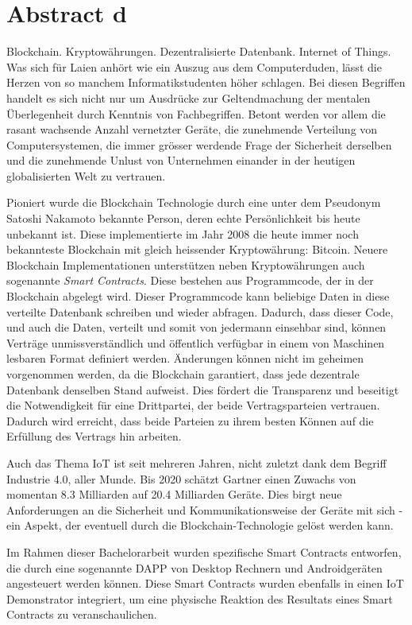 \chapter{Abstract d}
\label{cha:abstract_d}
Blockchain. Kryptowährungen. Dezentralisierte Datenbank. Internet of Things. Was sich für Laien anhört wie ein Auszug aus dem Computerduden, lässt die Herzen von so manchem Informatikstudenten höher schlagen. Bei diesen Begriffen handelt es sich nicht nur um Ausdrücke zur Geltendmachung der mentalen Überlegenheit durch Kenntnis von Fachbegriffen. Betont werden vor allem die rasant wachsende Anzahl vernetzter Geräte, die zunehmende Verteilung von Computersystemen, die immer grösser werdende Frage der Sicherheit derselben und die zunehmende Unlust von Unternehmen einander in der heutigen globalisierten Welt zu vertrauen.

Pioniert wurde die Blockchain Technologie durch eine unter dem Pseudonym Satoshi Nakamoto bekannte Person, deren echte Persönlichkeit bis heute unbekannt ist. Diese implementierte im Jahr 2008 die heute immer noch bekannteste Blockchain mit gleich heissender Kryptowährung: Bitcoin. Neuere Blockchain Implementationen unterstützen neben Kryptowährungen auch sogenannte \emph{Smart Contracts}. Diese bestehen aus Programmcode, der in der Blockchain abgelegt wird. Dieser Programmcode kann beliebige Daten in diese verteilte Datenbank schreiben und wieder abfragen. Dadurch, dass dieser Code, und auch die Daten, verteilt und somit von jedermann einsehbar sind, können Verträge unmissverständlich und öffentlich verfügbar in einem von Maschinen lesbaren Format definiert werden. Änderungen können nicht im geheimen vorgenommen werden, da die Blockchain garantiert, dass jede dezentrale Datenbank denselben Stand aufweist. Dies fördert die Transparenz und beseitigt die Notwendigkeit für eine Drittpartei, der beide Vertragsparteien vertrauen. Dadurch wird erreicht, dass beide Parteien zu ihrem besten Können auf die Erfüllung des Vertrags hin arbeiten.

Auch das Thema \acrshort{IoT} ist seit mehreren Jahren, nicht zuletzt dank dem Begriff Industrie 4.0, aller Munde. Bis 2020 schätzt Gartner einen Zuwachs von momentan 8.3 Milliarden auf 20.4 Milliarden Geräte. Dies birgt neue Anforderungen an die Sicherheit und Kommunikationsweise der Geräte mit sich - ein Aspekt, der eventuell durch die Blockchain-Technologie gelöst werden kann.\cite{gartner.com_iot,BlockchainRevolution}

Im Rahmen dieser Bachelorarbeit wurden spezifische Smart Contracts entworfen, die durch eine sogenannte \acrfull{DAPP} von Desktop Rechnern und Androidgeräten angesteuert werden können. Diese Smart Contracts wurden ebenfalls in einen IoT Demonstrator integriert, um eine physische Reaktion des Resultats eines Smart Contracts zu veranschaulichen.


